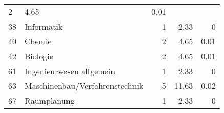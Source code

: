 \begin{longtable}{lXrrr}
       \num{2} &
       \num[round-mode=places,round-precision=2]{4.65} &
         \num[round-mode=places,round-precision=2]{0.01} \\

     38 &
     \multicolumn{1}{X}{ Informatik   } &


       \num{1} &
       \num[round-mode=places,round-precision=2]{2.33} &
         \num[round-mode=places,round-precision=2]{0} \\

     40 &
     \multicolumn{1}{X}{ Chemie   } &


       \num{2} &
       \num[round-mode=places,round-precision=2]{4.65} &
         \num[round-mode=places,round-precision=2]{0.01} \\

     42 &
     \multicolumn{1}{X}{ Biologie   } &


       \num{2} &
       \num[round-mode=places,round-precision=2]{4.65} &
         \num[round-mode=places,round-precision=2]{0.01} \\

     61 &
     \multicolumn{1}{X}{ Ingenieurwesen allgemein   } &


       \num{1} &
       \num[round-mode=places,round-precision=2]{2.33} &
         \num[round-mode=places,round-precision=2]{0} \\

     63 &
     \multicolumn{1}{X}{ Maschinenbau/Verfahrenstechnik   } &


       \num{5} &
       \num[round-mode=places,round-precision=2]{11.63} &
         \num[round-mode=places,round-precision=2]{0.02} \\

     67 &
     \multicolumn{1}{X}{ Raumplanung   } &


       \num{1} &
       \num[round-mode=places,round-precision=2]{2.33} &
         \num[round-mode=places,round-precision=2]{0} \\


\end{longtable}
